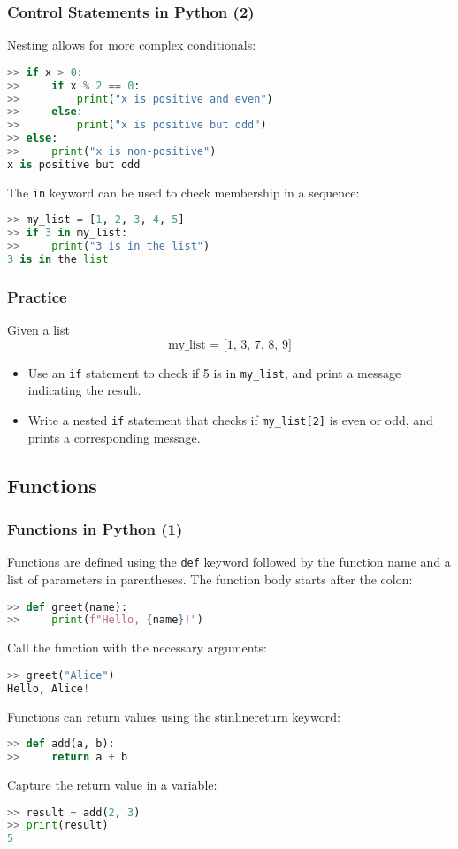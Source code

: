 \begin{frame}[fragile]
  \frametitle{Control Statements in Python (2)}
  Nesting allows for more complex conditionals:
  \begin{lstlisting}[language=Python, numbers=none]
>> if x > 0:
>>     if x % 2 == 0:
>>         print("x is positive and even")
>>     else:
>>         print("x is positive but odd")
>> else:
>>     print("x is non-positive")
x is positive but odd
  \end{lstlisting}\pause
  The \lstinline{in} keyword can be used to check membership in a sequence:
  \begin{lstlisting}[language=Python, numbers=none]
>> my_list = [1, 2, 3, 4, 5]
>> if 3 in my_list:
>>     print("3 is in the list")
3 is in the list
  \end{lstlisting}
\end{frame}

\begin{frame}[fragile]
 \frametitle{Practice}
 Given a list
 \[
    \text{my\_list = [1, 3, 7, 8, 9]}
 \]
 \begin{itemize}
  \item Use an \lstinline{if} statement to check if 5 is in \lstinline{my_list}, and print a message indicating the result.\pause
  \item Write a nested \lstinline{if} statement that checks if \lstinline{my_list[2]} is even or odd, and prints a corresponding message.
 \end{itemize}
\end{frame}

\subsection*{Functions}
\begin{frame}[fragile]
  \frametitle{Functions in Python (1)}
  Functions are defined using the \lstinline{def} keyword followed by the function name and a list of parameters in parentheses. The function body starts after the colon:
  \begin{lstlisting}[language=Python, numbers=none]
>> def greet(name):
>>     print(f"Hello, {name}!")
  \end{lstlisting}\pause
  Call the function with the necessary arguments:
  \begin{lstlisting}[language=Python, numbers=none]
>> greet("Alice")
Hello, Alice!
  \end{lstlisting}\pause
  Functions can return values using the stinline{return} keyword:
  \begin{lstlisting}[language=Python, numbers=none]
>> def add(a, b):
>>     return a + b
  \end{lstlisting}\pause
  Capture the return value in a variable:
  \begin{lstlisting}[language=Python, numbers=none]
>> result = add(2, 3)
>> print(result)
5
  \end{lstlisting}
\end{frame}

